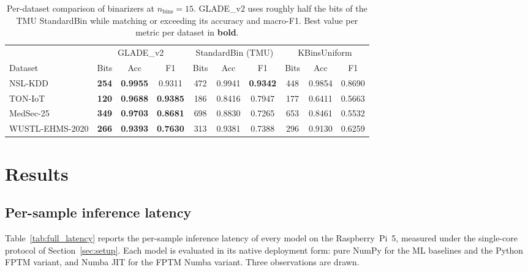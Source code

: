 \documentclass[journal,10pt]{IEEEtran}
\begin{document}

\begin{table}[t]
\centering
\caption{Per-dataset comparison of binarizers at $n_{\text{bins}}{=}15$. GLADE\_v2 uses roughly half the bits of the TMU StandardBin while matching or exceeding its accuracy and macro-F1. Best value per metric per dataset in \textbf{bold}.}
\label{tab:binarizer_comparison}
\begin{tabular}{l ccc ccc ccc}
\toprule
 & \multicolumn{3}{c}{GLADE\_v2} & \multicolumn{3}{c}{StandardBin (TMU)} & \multicolumn{3}{c}{KBinsUniform} \\
\cmidrule(lr){2-4} \cmidrule(lr){5-7} \cmidrule(lr){8-10}
Dataset & Bits & Acc & F1 & Bits & Acc & F1 & Bits & Acc & F1 \\
\midrule
NSL-KDD         & \textbf{254} & \textbf{0.9955} & 0.9311          & 472 & 0.9941 & \textbf{0.9342} & 448 & 0.9854 & 0.8690 \\
TON-IoT         & \textbf{120} & \textbf{0.9688} & \textbf{0.9385} & 186 & 0.8416 & 0.7947          & 177 & 0.6411 & 0.5663 \\
MedSec-25       & \textbf{349} & \textbf{0.9703} & \textbf{0.8681} & 698 & 0.8830 & 0.7265          & 653 & 0.8461 & 0.5532 \\
WUSTL-EHMS-2020 & \textbf{266} & \textbf{0.9393} & \textbf{0.7630} & 313 & 0.9381 & 0.7388          & 296 & 0.9130 & 0.6259 \\
\bottomrule
\end{tabular}
\end{table}
\section{Results}
\label{sec:results}

\subsection{Per-sample inference latency}
\label{sec:res-latency}

Table~\ref{tab:full_latency} reports the per-sample inference latency
of every model on the Raspberry~Pi~5, measured under the single-core
protocol of Section~\ref{sec:setup}. Each model is evaluated in its
native deployment form: pure NumPy for the ML baselines and the Python
FPTM variant, and Numba JIT for the FPTM Numba variant. Three
observations are drawn.
\end{document}
